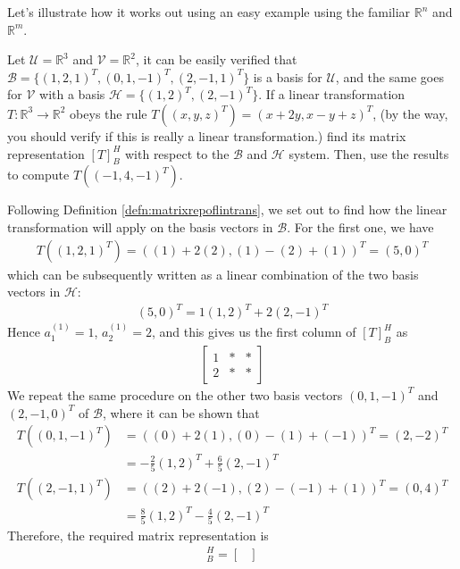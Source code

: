 Let's illustrate how it works out using an easy example using the familiar $\mathbb{R}^n$ and $\mathbb{R}^m$. 
\begin{exmp}
\label{exmp:lineartransmatrixrep}
Let $\mathcal{U} = \mathbb{R}^3$ and $\mathcal{V} = \mathbb{R}^2$, it can be easily verified that $\mathcal{B} = \{(1,2,1)^T, (0,1,-1)^T, (2,-1,1)^T\}$ is a basis for $\mathcal{U}$, and the same goes for $\mathcal{V}$ with a basis $\mathcal{H} = \{(1,2)^T, (2,-1)^T\}$. If a linear transformation $T: \mathbb{R}^3 \to \mathbb{R}^2$ obeys the rule $T((x,y,z)^T) = (x+2y, x-y+z)^T$, (by the way, you should verify if this is really a linear transformation.) find its matrix representation $[T]_B^H$ with respect to the $\mathcal{B}$ and $\mathcal{H}$ system. Then, use the results to compute $T((-1,4,-1)^T)$.
\end{exmp}
\begin{solution}
Following Definition \ref{defn:matrixrepoflintrans}, we set out to find how the linear transformation will apply on the basis vectors in $\mathcal{B}$. For the first one, we have
\begin{align*}
T((1,2,1)^T) = ((1)+2(2), (1)-(2)+(1))^T = (5,0)^T
\end{align*}
which can be subsequently written as a linear combination of the two basis vectors in $\mathcal{H}$:
\begin{align*}
(5,0)^T = 1(1,2)^T + 2(2,-1)^T
\end{align*}
Hence $a_1^{(1)} = 1$, $a_2^{(1)} = 2$, and this gives us the first column of $[T]_B^H$ as
\begin{align*}
\begin{bmatrix}
1 & * & * \\
2 & * & * 
\end{bmatrix}
\end{align*}
We repeat the same procedure on the other two basis vectors $(0,1,-1)^T$ and $(2,-1,0)^T$ of $\mathcal{B}$, where it can be shown that
\begin{align*}
T((0,1,-1)^T) &= ((0)+2(1), (0)-(1)+(-1))^T = (2,-2)^T \\
&= -\frac{2}{5}(1,2)^T + \frac{6}{5}(2,-1)^T \\
T((2,-1,1)^T) &= ((2)+2(-1), (2)-(-1)+(1))^T = (0,4)^T \\
&= \frac{8}{5}(1,2)^T - \frac{4}{5}(2,-1)^T
\end{align*}
Therefore, the required matrix representation is
\begin{align*}
[T]_B^H = 
\begin{bmatrix}

\end{bmatrix}
\end{align*}
\end{solution}

